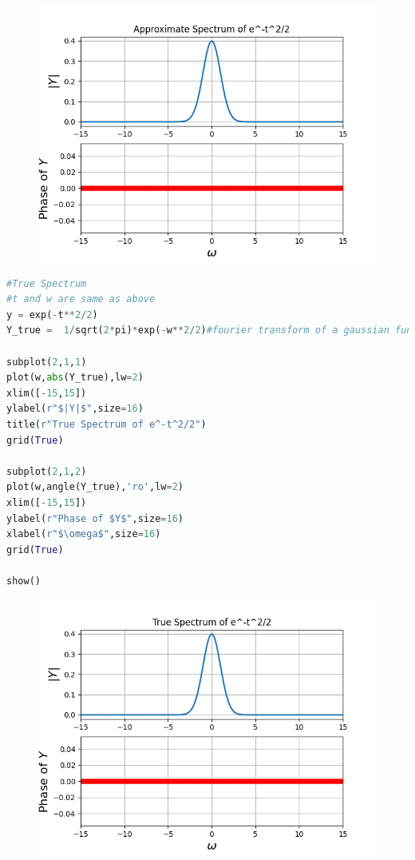 \documentclass[11pt, a4paper]{article}
\begin{document}
\begin{figure}[H]
    \centering
    \includegraphics[scale = 0.7]{Figure_8.png}
\end{figure}

\begin{lstlisting}[language = Python]
#True Spectrum
#t and w are same as above
y = exp(-t**2/2)
Y_true =  1/sqrt(2*pi)*exp(-w**2/2)#fourier transform of a gaussian function is a gaussian function

subplot(2,1,1)
plot(w,abs(Y_true),lw=2)
xlim([-15,15])
ylabel(r"$|Y|$",size=16)
title(r"True Spectrum of e^-t^2/2")
grid(True)

subplot(2,1,2)
plot(w,angle(Y_true),'ro',lw=2)
xlim([-15,15])
ylabel(r"Phase of $Y$",size=16)
xlabel(r"$\omega$",size=16)
grid(True)

show()

\end{lstlisting}

\begin{figure}[H]
    \centering
    \includegraphics[scale = 0.8]{Figure_9.png}
\end{figure}
\end{document}
